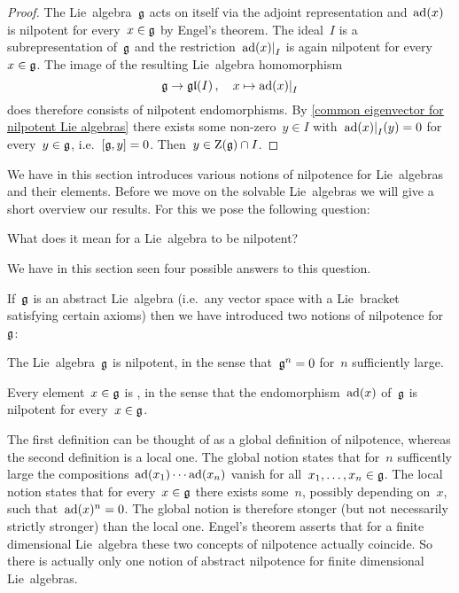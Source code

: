 \begin{proof}
  The Lie~algebra~$\mathfrak{g}$ acts on itself via the adjoint representation and~$\operatorname{ad}(x)$ is nilpotent for every~$x \in \mathfrak{g}$ by Engel’s theorem.
  The ideal~$I$ is a subrepresentation of~$\mathfrak{g}$ and the restriction~$\restrict{\ad(x)}{I}$ is again nilpotent for every~$x \in \mathfrak{g}$.
  The image of the resulting Lie~algebra homomorphism
  \[
    \glie
    \to
    \gllie(I) \,,
    \quad
    x
    \mapsto
    \restrict{\ad(x)}{I}
  \]
  does therefore consists of nilpotent endomorphisms.
  By \cref{common eigenvector for nilpotent Lie algebras} there exists some non-zero~$y \in I$ with~$\restrict{\ad(x)}{I}(y) = 0$ for every~$y \in \mathfrak{g}$, i.e.~$[\mathfrak{g}, y] = 0$.
  Then~$y \in \operatorname{Z}(\mathfrak{g}) \cap I$.
\end{proof}


\begin{remark}
  We have in this section introduces various notions of nilpotence for Lie~algebras and their elements.
  Before we move on the solvable Lie~algebras we will give a short overview our results.
  For this we pose the following question:
  \begin{center}
    What does it mean for a Lie~algebra to be nilpotent?
  \end{center}
  We have in this section seen four possible answers to this question.
  
  If~$\mathfrak{g}$ is an abstract Lie~algebra (i.e.\ any vector space with a Lie~bracket satisfying certain axioms) then we have introduced two notions of nilpotence for~$\mathfrak{g}$:
  \begin{equivalenceslist}[label=N\arabic*)]
    \item
      The Lie~algebra~$\mathfrak{g}$ is nilpotent, in the sense that~$\mathfrak{g}^n = 0$ for~$n$ sufficiently large.
    \item
      Every element~$x \in \mathfrak{g}$ is {\adnilpotent}, in the sense that the endomorphism~$\operatorname{ad}(x)$ of~$\mathfrak{g}$ is nilpotent for every~$x \in \mathfrak{g}$.
  \end{equivalenceslist}
  The first definition can be thought of as a global definition of nilpotence, whereas the second definition is a local one.
  The global notion states that for~$n$ sufficently large the compositions~$\operatorname{ad}(x_1) \dotsm \operatorname{ad}(x_n)$ vanish for all~$x_1, \dotsc, x_n \in \mathfrak{g}$.
  The local notion states that for every~$x \in \mathfrak{g}$ there exists some~$n$, possibly depending on~$x$, such that~$\operatorname{ad}(x)^n = 0$.
  The global notion is therefore stonger (but not necessarily strictly stronger) than the local one.
  Engel’s theorem asserts that for a finite dimensional Lie~algebra these two concepts of nilpotence actually coincide.
  So there is actually only one notion of abstract nilpotence for finite dimensional Lie~algebras.
  

\end{remark}
